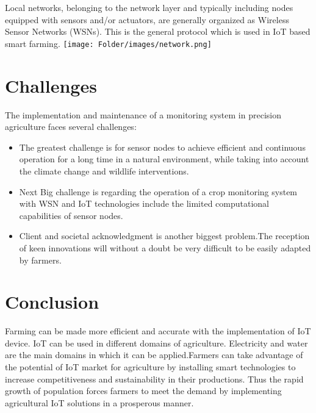 \documentclass{report}
\begin{document}
\begin{multicols}{1}
    Local networks, belonging to the network layer and typically including nodes equipped with sensors and/or actuators, are generally organized as Wireless Sensor Networks (WSNs). This is the general protocol which is used in IoT based smart farming.
    \texttt{[image: Folder/images/network.png]}
    
    \section*{Challenges}
    The implementation and maintenance of a monitoring system in precision agriculture faces several challenges:
    
    \begin{itemize}
        \item  The greatest challenge is for sensor nodes to 
        achieve efficient and continuous operation for a long
        time in a natural environment, while taking into 
        account the climate change and wildlife interventions.
        
        \item Next Big challenge is regarding the operation of 
        a crop monitoring system with WSN and IoT technologies
        include the limited computational capabilities of 
        sensor nodes.
        
        \item Client and societal acknowledgment is another biggest problem.The reception of keen innovations will 
        without a doubt be very difficult to be easily adapted by farmers.
    \end{itemize}
    \section*{Conclusion}
    Farming can be made more efficient and accurate with the 
    implementation of IoT device. IoT can be used in different 
    domains of agriculture. Electricity and water are the main
    domains in which it can be applied.Farmers can take 
    advantage of the potential of IoT market for agriculture 
    by installing smart technologies to increase 
    competitiveness and sustainability in their productions. 
    Thus the rapid growth of population forces farmers to meet 
    the demand by implementing agricultural IoT solutions in a 
    prosperous manner.
\end{multicols}
\end{document}
